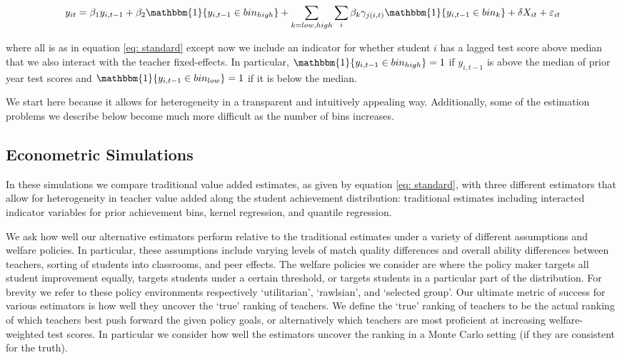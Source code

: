 \documentclass[letterpaper,12pt]{article}
\begin{document}
    \begin{equation}\label{eq: bins}
        y_{it} = \beta_1 y_{i,t-1} + \beta_2 \mathbbm{1}\{y_{i,t-1} \in bin_{high}\}
        + \sum_{k=low, high}\sum_{i}\beta_k \gamma_{j(i,t)} \mathbbm{1}\{y_{i,t-1} \in bin_k\} + \delta X_{it} + \varepsilon_{it}
    \end{equation} 
    
\noindent where all is as in equation \ref{eq: standard} except now we include an indicator for whether student $i$ has a lagged test score above median that we also interact with the teacher fixed-effects. In particular, $\mathbbm{1}\{y_{i,t-1} \in bin_{high}\} = 1$ if $y_{i,t-1}$ is above the median of prior year test scores and $\mathbbm{1}\{y_{i,t-1} \in bin_{low}\} = 1$ if it is below the median.

We start here because it allows for heterogeneity in a transparent and intuitively appealing way. Additionally, some of the estimation problems we describe below become much more difficult as the number of bins increases.



\subsection{Econometric Simulations}

In these simulations we compare traditional value added estimates, as given by equation \ref{eq: standard}, with three different estimators that allow for heterogeneity in teacher value added along the student achievement distribution: traditional estimates including interacted indicator variables for prior achievement bins, kernel regression, and quantile regression.

We ask how well our alternative estimators perform relative to the traditional estimates under a variety of different assumptions and welfare policies. In particular, these assumptions include varying levels of match quality differences and overall ability differences between teachers, sorting of students into classrooms, and peer effects. The welfare policies we consider are where the policy maker targets all student improvement equally, targets students under a certain threshold, or targets students in a particular part of the distribution. For brevity we refer to these policy environments respectively `utilitarian', `rawlsian', and `selected group'. Our ultimate metric of success for various estimators is how well they uncover the `true' ranking of teachers. We define the `true' ranking of teachers to be the actual ranking of which teachers best push forward the given policy goals, or alternatively which teachers are most proficient at increasing welfare-weighted test scores. In particular we consider how well the estimators uncover the ranking in a Monte Carlo setting (if they are consistent for the truth).
\end{document}
